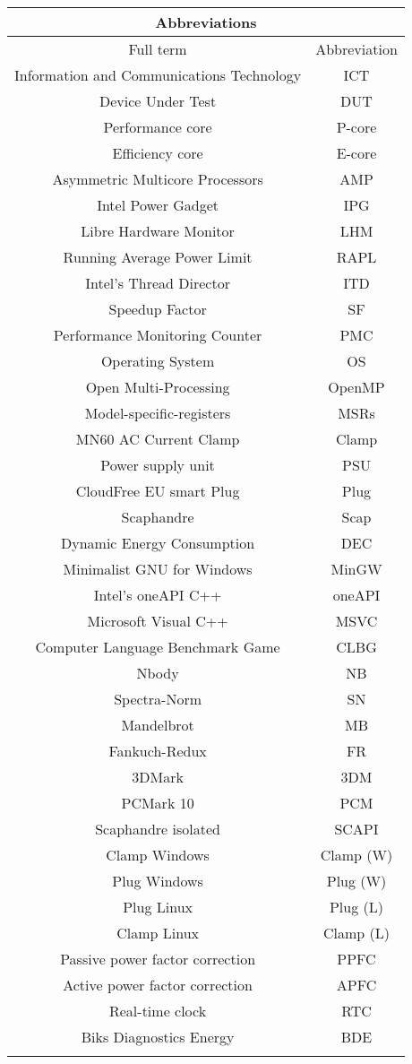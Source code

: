 \begin{table}[H]
    \centering
    \begin{tabular}{|| c | c ||}
    \hline
    \multicolumn{2}{||c||}{Abbreviations} \\ [0.5ex] \hline\hline
    Full term & Abbreviation \\\hline
    Information and Communications Technology & ICT \\
    Device Under Test & DUT \\
    Performance core & P-core \\
    Efficiency core & E-core\\
    Asymmetric Multicore Processors & AMP \\
    Intel Power Gadget & IPG \\
    Libre Hardware Monitor & LHM \\
    Running Average Power Limit & RAPL \\
    Intel's Thread Director & ITD\\
    Speedup Factor & SF\\
    Performance Monitoring Counter & PMC\\
    Operating System & OS \\
    Open Multi-Processing & OpenMP\\
    Model-specific-registers & MSRs \\
    MN60 AC Current Clamp & Clamp\\
    Power supply unit & PSU \\
    CloudFree EU smart Plug & Plug \\
    Scaphandre & Scap \\
    Dynamic Energy Consumption & DEC \\
    Minimalist GNU for Windows & MinGW \\
    Intel's oneAPI C++ & oneAPI \\
    Microsoft Visual C++ & MSVC \\
    Computer Language Benchmark Game  & CLBG \\
    Nbody & NB \\
    Spectra-Norm & SN \\
    Mandelbrot& MB \\
    Fankuch-Redux& FR \\
    3DMark  & 3DM \\
    PCMark 10  & PCM \\
    Scaphandre isolated  & SCAPI \\
    Clamp Windows & Clamp (W) \\
    Plug Windows & Plug (W) \\
    Plug Linux & Plug (L) \\
    Clamp Linux& Clamp (L) \\
    Passive power factor correction & PPFC  \\
    Active power factor correction & APFC \\
    Real-time clock & RTC \\
    Biks Diagnostics Energy & BDE \\
    &  \\
      




\end{tabular}
\end{table}
